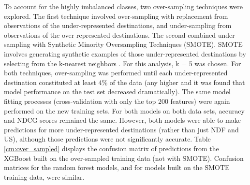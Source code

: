 \documentclass{article}
\begin{document}
To account for the highly imbalanced classes, two over-sampling techniques were explored. The first technique involved over-sampling with replacement from observations of the under-represented destinations, and under-sampling from observations of the over-represented destinations. The second combined under-sampling with Synthetic Minority Oversampling Techniques (SMOTE). SMOTE involves generating synthetic examples of those under-represented destinations by selecting from the k-nearest neighbors \cite{Chawla2002}. For this analysis, k = 5 was chosen. For both techniques, over-sampling was performed until each under-represented destination constituted at least 4\% of the data (any higher and it was found that model performance on the test set decreased dramatically). The same model fitting processes (cross-validation with only the top 200 features) were again performed on the new training sets. For both models on both data sets, accuracy and NDCG scores remained the same. However, both models were able to make predictions for more under-represented destinations (rather than just NDF and US), although those predictions were not significantly accurate. Table \ref{cm:over_sampled} displays the confusion matrix of predictions from the XGBoost built on the over-sampled training data (not with SMOTE). Confusion matrices for the random forest models, and for models built on the SMOTE training data, were similar. 
\end{document}
